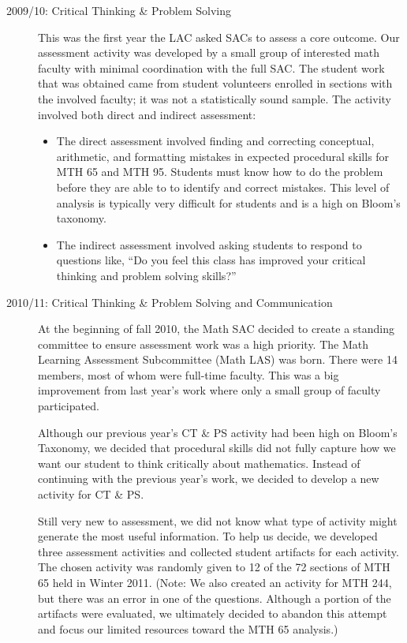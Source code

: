 \begin{description}
\item [2009/10: Critical Thinking  \& Problem Solving]

This was the first year the LAC asked SACs to assess a core outcome. Our
assessment activity was developed by a small group of interested math faculty
with minimal coordination with the full SAC. The student work that was obtained
came from student volunteers enrolled in sections with the involved faculty; it
was not a statistically sound sample.  The activity involved both direct and
indirect assessment: 
\begin{itemize}
\item The direct assessment involved finding and correcting conceptual,
  arithmetic, and formatting mistakes in expected procedural skills for MTH 65
  and MTH 95. Students must know how to do the problem before they are able to
  to identify and correct mistakes. This level of analysis is typically very
  difficult for students and is a high on Bloom's taxonomy.

\item The indirect assessment involved asking students to respond to questions
  like, ``Do you feel this class has improved your critical thinking and problem
  solving skills?''
\end{itemize}

\item[2010/11:  Critical Thinking \& Problem Solving and Communication]

At the beginning of fall 2010, the Math SAC decided to create a standing
committee to ensure assessment work was a high priority. The Math Learning
Assessment Subcommittee (Math LAS) was born.  There were 14 members, most of
whom were full-time faculty. This was a big improvement from last year's work
where only a small group of faculty participated.

Although our previous year's CT \& PS activity had been high on Bloom's
Taxonomy, we decided that procedural skills did not fully capture how we want
our student to think critically about mathematics.  Instead of continuing with
the previous year's work, we decided to develop a new activity for CT \& PS. 

Still very new to assessment, we did not know what type of activity might
generate the most useful information.  To help us decide, we developed three
assessment activities and collected student artifacts for each activity.  The
chosen activity was randomly given to 12 of the 72 sections of MTH 65 held in
Winter 2011.  (Note: We also created an activity for MTH 244, but there was an
error in one of the questions.  Although a portion of the artifacts were
evaluated, we ultimately decided to abandon this attempt and focus our limited
resources toward the MTH 65 analysis.)


\end{description}
